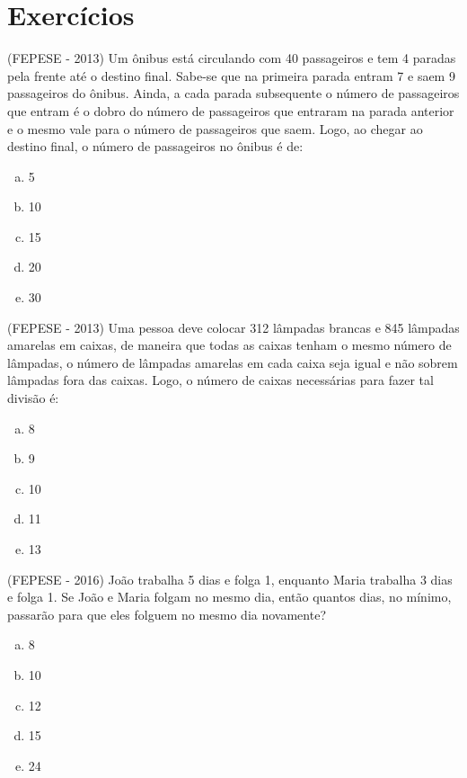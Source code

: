 \section{Exercícios}
 \begin{exer}
 (FEPESE - 2013) Um ônibus está circulando com 40 passageiros e tem 4 paradas pela frente até o destino final. Sabe-se que na primeira parada entram 7 e saem 9 passageiros do ônibus. Ainda, a cada parada subsequente o número de passageiros que entram é o dobro do número de passageiros que entraram na parada anterior e o mesmo vale para o número de passageiros que saem. Logo, ao chegar ao destino final, o número de passageiros no ônibus é de:
 \begin{enumerate}[a)]
 \item 5
 \item 10
 \item 15
 \item 20
 \item 30
 \end{enumerate}
 \end{exer}

 \begin{exer}
 (FEPESE - 2013) Uma pessoa deve colocar 312 lâmpadas brancas e 845 lâmpadas amarelas em caixas, de maneira que todas as caixas tenham o mesmo número de lâmpadas, o número de lâmpadas amarelas em cada caixa seja igual e não sobrem lâmpadas fora das caixas. Logo, o número de caixas necessárias para fazer tal divisão é:
  \begin{enumerate}[a)]
  \item 8
  \item 9
  \item 10
  \item 11
  \item 13
  \end{enumerate}
 \end{exer}

 \begin{exer}
 (FEPESE - 2016) João trabalha 5 dias e folga 1, enquanto Maria trabalha 3 dias e folga 1. Se João e Maria folgam no mesmo dia, então quantos dias, no mínimo, passarão para que eles folguem no mesmo dia novamente?
  \begin{enumerate}[a)]
  \item 8
  \item 10
  \item 12
  \item 15
  \item 24
  \end{enumerate}
 \end{exer}

